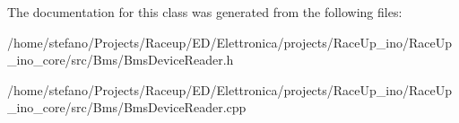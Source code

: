 The documentation for this class was generated from the following files\+:\begin{DoxyCompactItemize}
\item 
/home/stefano/\+Projects/\+Raceup/\+E\+D/\+Elettronica/projects/\+Race\+Up\+\_\+ino/\+Race\+Up\+\_\+ino\+\_\+core/src/\+Bms/Bms\+Device\+Reader.\+h\item 
/home/stefano/\+Projects/\+Raceup/\+E\+D/\+Elettronica/projects/\+Race\+Up\+\_\+ino/\+Race\+Up\+\_\+ino\+\_\+core/src/\+Bms/Bms\+Device\+Reader.\+cpp\end{DoxyCompactItemize}
